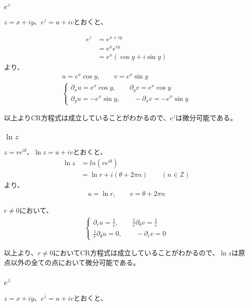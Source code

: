 \documentclass[dvipdfmx,a4paper]{jsarticle}
\begin{document}
\subsubsection{$e^z$}
$z = x + iy$、$e^z = u + iv$とおくと、

\begin{align*}
e^z &= e^{x+iy} \\
&= e^xe^{iy}\\
&= e^x(\cos{y} + i\sin{y})
\end{align*}
より、
\begin{align*}
u = e^x\cos{y}, \qquad v = e^x\sin{y}\\
\begin{cases}
\partial_x u = e^x\cos{y}, \qquad \partial_y v = e^x\cos{y}\\
\partial_y u = -e^x\sin{y}, \qquad -\partial_x v = -e^x\sin{y}
\end{cases}
\end{align*}

以上よりCR方程式は成立していることがわかるので、$e^z$は微分可能である。\\

\subsubsection{$\ln z$}
$z = re^{i\theta}$、$\ln z = u + iv$とおくと、
\begin{align*}
\ln{z} &= ln{(re^{i\theta})} \\
&= \ln{r} + i(\theta + 2\pi n)\qquad ( n\in\mathbb{Z})
\end{align*}
より、
\begin{align*}
u = \ln{r}, \qquad v = \theta + 2\pi n
\end{align*}

$r\neq 0$において、
\begin{align*}
\begin{cases}
\partial_r u = \frac{1}{r}, \qquad \frac{1}{r}\partial_\theta v = \frac{1}{r}\\
\frac{1}{r}\partial_\theta u = 0, \qquad -\partial_r v = 0
\end{cases}
\end{align*}

以上より、$r\neq 0$においてCR方程式は成立していることがわかるので、$\ln z$は原点以外の全ての点において微分可能である。\\

\subsubsection{$e^{\bar z}$}
$z = x + iy$、$e^{\bar z} = u + iv$とおくと、
\end{document}
